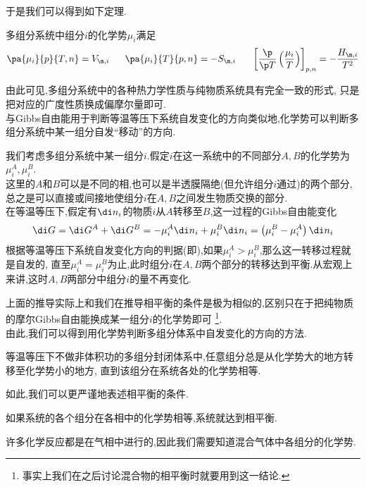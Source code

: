 \documentclass{ctexart}
\begin{document}
于是我们可以得到如下定理.
\begin{theorem}[4B.3.3 化学势与温度和压力的关系]
    多组分系统中组分$i$的化学势$\mu_i$满足
    \[\pa{\mu_i}{p}{T,n}=V_{\m,i}\ \ \ \ \ \pa{\mu_i}{T}{p,n}=-S_{\m,i}\ \ \ \ \ \left[\dfrac{\p}{\p T}\left(\dfrac{\mu_i}{T}\right)\right]_{p,n}=-\dfrac{H_{\m,i}}{T^2}\]

\end{theorem}
由此可见,多组分系统中的各种热力学性质与纯物质系统具有完全一致的形式,%
只是把对应的广度性质换成偏摩尔量即可.\vspace{4pt}\\
\indent 与Gibbs自由能用于判断等温等压下系统自发变化的方向类似地,化学势可以判断多组分系统中某一组分自发“移动”的方向.
\begin{derivation}
    我们考虑多组分系统中某一组分$i$.假定$i$在这一系统中的不同部分$A,B$的化学势为$\mu_i^A,\mu_i^B$.\\
    这里的$A$和$B$可以是不同的相,也可以是半透膜隔绝(但允许组分$i$通过)的两个部分,%
    总之是可以直接或间接地使组分$i$在$A,B$之间发生物质交换的部分.\\
    在等温等压下,假定有$\di n_i$的物质$i$从$A$转移至$B$,这一过程的Gibbs自由能变化
    \[\di G=\di G^A+\di G^B=-\mu_i^A\di n_{i}+\mu_i^B\di n_i=\left(\mu_i^B-\mu_i^A\right)\di n_i\]
    根据等温等压下系统自发变化方向的判据(即),如果$\mu_i^A>\mu_i^B$,那么这一转移过程就是自发的,%
    直至$\mu_i^A=\mu_i^B$为止,此时组分$i$在$A,B$两个部分的转移达到平衡.从宏观上来讲,这时$A,B$两部分中组分$i$的量不再变化.
\end{derivation}
上面的推导实际上和我们在推导相平衡的条件是极为相似的,区别只在于把纯物质的摩尔Gibbs自由能换成某一组分$i$的化学势即可%
\footnote{事实上我们在之后讨论混合物的相平衡时就要用到这一结论.}.\\
\indent 由此,我们可以得到用化学势判断多组分体系中自发变化的方向的方法.
\begin{theorem}[4B.3.4 多组分体系自发变化的方向]
    等温等压下不做非体积功的多组分封闭体系中,任意组分总是从化学势大的地方转移至化学势小的地方,%
    直到该组分在系统各处的化学势相等.
\end{theorem}
如此,我们可以更严谨地表述相平衡的条件.
\begin{theorem}[4B.3.5 相平衡的条件]
    如果系统的各个组分在各相中的化学势相等,系统就达到相平衡.
\end{theorem}
\vspace{8pt}
\indent 许多化学反应都是在气相中进行的,因此我们需要知道混合气体中各组分的化学势.%
\end{document}

